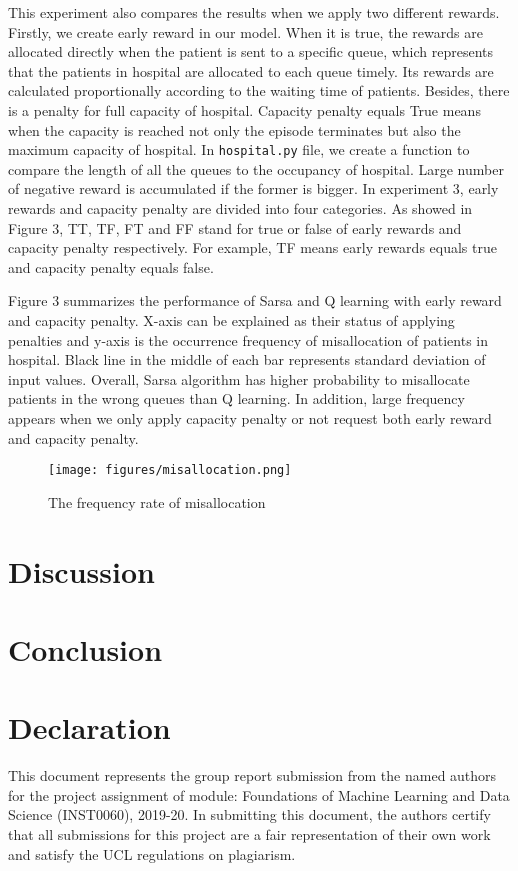 \documentclass[11point]{article}
\begin{document}
This experiment also compares the results when we apply two different rewards. Firstly, we create early reward in our model. When it is true, the rewards are allocated directly when the patient is sent to a specific queue, which represents that the patients in hospital are allocated to each queue timely. Its rewards are calculated proportionally according to the waiting time of patients.
Besides, there is a penalty for full capacity of hospital. Capacity penalty equals True means when the capacity is reached not only the episode terminates but also the  maximum capacity of hospital. In \texttt{hospital.py} file, we create a function to compare the length of all the queues to the occupancy of hospital. Large number of negative reward is accumulated if the former is bigger. 
In experiment 3, early rewards and capacity penalty are divided into four categories. As showed in Figure 3, TT, TF, FT and FF stand for true or false of early rewards and capacity penalty respectively. For example, TF means early rewards equals true and capacity penalty equals false.

Figure 3 summarizes the performance of Sarsa and Q learning with early reward and capacity penalty. X-axis can be explained as their status of applying penalties and y-axis is the occurrence frequency of misallocation of patients in hospital. Black line in the middle of each bar represents standard deviation of input values. Overall, Sarsa algorithm has higher probability to misallocate patients in the wrong queues than Q learning. In addition, large frequency appears when we only apply capacity penalty or not request both early reward and capacity penalty.

\begin{figure}
    \centering
    \texttt{[image: figures/misallocation.png]}
    \caption{The frequency rate of misallocation}
    \label{fig:penalty_diagram}
\end{figure}


\section{Discussion}

\section{Conclusion}


\section*{Declaration}
This document represents the group report submission from the named authors for the project assignment of module: Foundations of Machine Learning and Data Science (INST0060), 2019-20. In submitting this document, the authors certify that all submissions for this project are a fair representation of their own work and satisfy the UCL regulations on  plagiarism.



\end{document}
